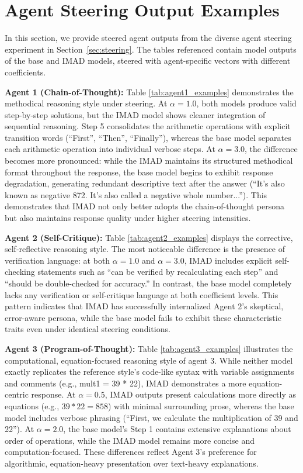 \section{Agent Steering Output Examples}\label{app:steering_qualitative}
In this section, we provide steered agent outputs from the diverse agent steering experiment in Section~\ref{sec:steering}. The tables referenced contain model outputs of the base and IMAD models, steered with agent-specific vectors with different coefficients.

\textbf{Agent 1 (Chain-of-Thought):} Table \ref{tab:agent1_examples} demonstrates the methodical reasoning style under steering. At $\alpha = 1.0$, both models produce valid step-by-step solutions, but the IMAD model shows cleaner integration of sequential reasoning.
Step 5 consolidates the arithmetic operations with explicit transition words (``First'', ``Then'', ``Finally''), whereas the base model separates each arithmetic operation into individual verbose steps. 
At $\alpha = 3.0$, the difference becomes more pronounced: while the IMAD maintains its structured methodical format throughout the response, the base model begins to exhibit response degradation, generating redundant descriptive text after the answer (``It's also known as negative 872. It's also called a negative whole number...''). This demonstrates that IMAD not only better adopts the chain-of-thought persona but also maintains response quality under higher steering intensities.

\textbf{Agent 2 (Self-Critique):} Table \ref{tab:agent2_examples} displays the corrective, self-reflective reasoning style. The most noticeable difference is the presence of verification language: at both $\alpha = 1.0$ and $\alpha = 3.0$, IMAD includes explicit self-checking statements such as ``can be verified by recalculating each step'' and ``should be double-checked for accuracy.'' In contrast, the base model completely lacks any verification or self-critique language at both coefficient levels. This pattern indicates that IMAD has successfully internalized Agent 2's skeptical, error-aware persona, while the base model fails to exhibit these characteristic traits even under identical steering conditions.

\textbf{Agent 3 (Program-of-Thought):} Table \ref{tab:agent3_examples} illustrates the computational, equation-focused reasoning style of agent 3. While neither model exactly replicates the reference style's code-like syntax with variable assignments and comments (e.g., mult1 = 39 * 22), IMAD demonstrates a more equation-centric response. At $\alpha = 0.5$, IMAD outputs present calculations more directly as equations (e.g., $39 * 22 = 858$) with minimal surrounding prose, whereas the base model includes verbose phrasing (``First, we calculate the multiplication of 39 and 22''). At $\alpha = 2.0$, the base model's Step 1 contains extensive explanations about order of operations, while the IMAD model remains more concise and computation-focused. These differences reflect Agent 3's preference for algorithmic, equation-heavy presentation over text-heavy explanations.


